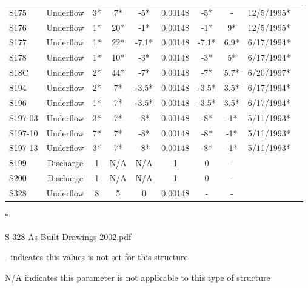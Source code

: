 \begin{table}[h]
\begin{tabular}{@{}lccccccccc@{}}
{S175}          & Underflow     & 3*       & 7*          & -5*          & 0.00148     & -5*             & -       & 12/5/1995*      \\
{S176}          & Underflow     & 1*       & 20*         & -1*          & 0.00148     & -1*             & 9*      & 12/5/1995*      \\
{S177}          & Underflow     & 1*       & 22*         & -7.1*        & 0.00148     &   -7.1*         & 6.9*    & 6/17/1994*      \\
{S178}          & Underflow     & 1*       & 10*         & -3*          & 0.00148     & -3*             & 5*      & 6/17/1994*      \\
{S18C}          & Underflow     & 2*       & 44*         & -7*          & 0.00148     & -7*             & 5.7*    & 6/20/1997*      \\
{S194}          & Underflow     & 2*       & 7*          & -3.5*        & 0.00148     & -3.5*           & 3.5*    & 6/17/1994*      \\
{S196}          & Underflow     & 1*       & 7*          & -3.5*        & 0.00148     & -3.5*           & 3.5*    & 6/17/1994*      \\
{S197-03}       & Underflow     & 3*       & 7*          & -8*          & 0.00148     & -8*             & -1*     & 5/11/1993*      \\
{S197-10}       & Underflow     & 7*       & 7*          & -8*          & 0.00148     & -8*             & -1*     & 5/11/1993*      \\
{S197-13}       & Underflow     & 3*       & 7*          & -8*          & 0.00148     & -8*             & -1*     & 5/11/1993*      \\
{S199}          & Discharge     & 1        & N/A         & N/A          & 1           & 0               & -       &                 \\
{S200}          & Discharge     & 1        & N/A         & N/A          & 1           & 0               & -       &                 \\
{S328}          & Underflow     & 8        & 5           & 0            & 0.00148     & -               & -       &                 \\
\hline
\end{tabular}

* \cite{corp2005}

S-328 As-Built Drawings 2002.pdf

- indicates this values is not set for this structure

N/A indicates this parameter is not applicable to this type of structure
\end{table}
\normalsize

